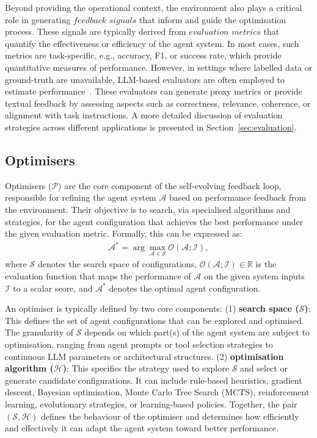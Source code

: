 \documentclass[]{selfevolagent}
\theoremstyle{plain}
\theoremstyle{definition}
\theoremstyle{remark}
\begin{document}
Beyond providing the operational context, the environment also plays a critical role in generating $\textit{feedback signals}$ that inform and guide the optimisation process. These signals are typically derived from $\textit{evaluation metrics}$ that quantify the effectiveness or efficiency of the agent system. In most cases, such metrics are task-specific, e.g., accuracy, F1, or success rate, which provide quantitative measures of performance. However, in settings where labelled data or ground-truth are unavailable, LLM-based evaluators are often employed to estimate performance~\citep{yehudai2025survey}. These evaluators can generate proxy metrics or provide textual feedback by assessing aspects such as correctness, relevance, coherence, or alignment with task instructions. A more detailed discussion of evaluation strategies across different applications is presented in Section~\ref{sec:evaluation}. 


\subsection{Optimisers}

Optimisers ($\mathcal{P}$) are the core component of the self-evolving feedback loop, responsible for refining the agent system $\mathcal{A}$ based on performance feedback from the environment. Their objective is to search, via specialised algorithms and strategies, for the agent configuration that achieves the best performance under the given evaluation metric. Formally, this can be expressed as:
\begin{align}
\mathcal{A}^* = \arg \max_{\mathcal{A} \in \mathcal{S}} \mathcal{O}(\mathcal{A}; \mathcal{I}),
\end{align}
where $\mathcal{S}$ denotes the search space of configurations, $\mathcal{O}(\mathcal{A}; \mathcal{I}) \in \mathbb{R}$ is the evaluation function that maps the performance of $\mathcal{A}$ on the given system inputs $\mathcal{I}$ to a scalar score, and $\mathcal{A}^*$ denotes the optimal agent configuration. 

An optimiser is typically defined by two core components: 
(1) \textbf{search space ($\mathcal{S}$)}: This defines the set of agent configurations that can be explored and optimised. The granularity of $\mathcal{S}$ depends on which part(s) of the agent system are subject to optimisation, ranging from agent prompts or tool selection strategies to continuous LLM parameters or architectural structures. 
(2) \textbf{optimisation algorithm ($\mathcal{H}$)}: This specifies the strategy used to explore $\mathcal{S}$ and select or generate candidate configurations. It can include rule-based heuristics, gradient descent, Bayesian optimisation, Monte Carlo Tree Search (MCTS), reinforcement learning, evolutionary strategies, or learning-based policies. Together, the pair $(\mathcal{S}, \mathcal{H})$ defines the behaviour of the optimiser and determines how efficiently and effectively it can adapt the agent system toward better performance. 
\end{document}
